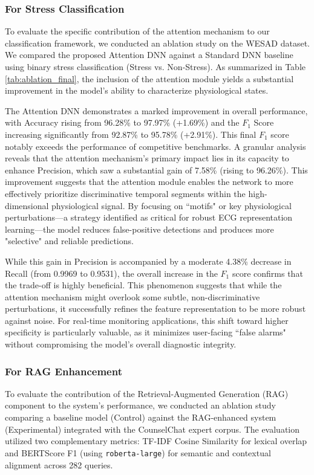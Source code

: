 \documentclass[journal,twoside,web]{ieeecolor}
\begin{document}
\subsubsection{For Stress Classification}

To evaluate the specific contribution of the attention mechanism to our classification framework, we conducted an ablation study on the WESAD dataset. We compared the proposed Attention DNN against a Standard DNN baseline using binary stress classification (Stress vs. Non-Stress). As summarized in Table \ref{tab:ablation_final}, the inclusion of the attention module yields a substantial improvement in the model’s ability to characterize physiological states. 

The Attention DNN demonstrates a marked improvement in overall performance, with Accuracy rising from 96.28\% to 97.97\% (+1.69\%) and the $F_1$ Score increasing significantly from 92.87\% to 95.78\% (+2.91\%). This final $F_1$ score notably exceeds the performance of competitive benchmarks. A granular analysis reveals that the attention mechanism's primary impact lies in its capacity to enhance Precision, which saw a substantial gain of 7.58\% (rising to 96.26\%). This improvement suggests that the attention module enables the network to more effectively prioritize discriminative temporal segments within the high-dimensional physiological signal. By focusing on ``motifs" or key physiological perturbations—a strategy identified as critical for robust ECG representation learning—the model reduces false-positive detections and produces more "selective" and reliable predictions.

While this gain in Precision is accompanied by a moderate 4.38\% decrease in Recall (from 0.9969 to 0.9531), the overall increase in the $F_1$ score confirms that the trade-off is highly beneficial. This phenomenon suggests that while the attention mechanism might overlook some subtle, non-discriminative perturbations, it successfully refines the feature representation to be more robust against noise. For real-time monitoring applications, this shift toward higher specificity is particularly valuable, as it minimizes user-facing ``false alarms" without compromising the model's overall diagnostic integrity.

\subsubsection{For RAG Enhancement} 
To evaluate the contribution of the Retrieval-Augmented Generation (RAG) component to the system's performance, we conducted an ablation study comparing a baseline model (Control) against the RAG-enhanced system (Experimental) integrated with the CounselChat expert corpus. The evaluation utilized two complementary metrics: TF-IDF Cosine Similarity for lexical overlap and BERTScore F1 (using \texttt{roberta-large}) for semantic and contextual alignment across 282 queries.
\end{document}
